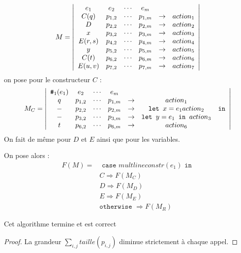 \documentclass{cours}
\begin{document}
\[
    M = \left|\begin{array}{cccccc}
        e_{1} & e_{2} & \cdots & e_{m} & &\\
        C(q) & p_{1, 2} & \cdots & p_{1, m} & \rightarrow & action_{1}\\
        D & p_{2, 2} & \cdots & p_{2, m} & \rightarrow & action_{2}\\
        x & p_{3, 2} & \cdots & p_{3, m} & \rightarrow & action_{3}\\
        E(r, s) & p_{4, 2} & \cdots & p_{4, m} & \rightarrow & action_{4}\\
        y & p_{5, 2} & \cdots & p_{5, m} & \rightarrow & action_{5}\\
        C(t)& p_{6, 2} & \cdots & p_{6, m} & \rightarrow & action_{6}\\
        E(u, v) & p_{7, 2} & \cdots & p_{7, m} & \rightarrow & action_{7}\\
    \end{array}\right|   
\]
on pose pour le constructeur $C$ : 
\[
    M_{C} = \left|\begin{array}{cccccc}
        \texttt{\#}_{1}(e_{1}) & e_{2} & \cdots & e_{m} & &\\
        q & p_{1, 2} & \cdots & p_{1, m} & \rightarrow & action_{1}\\
        - & p_{2, 2} & \cdots & p_{2, m} & \rightarrow & \texttt{let } x = e_{1}{action_{2}}\\
        - & p_{3, 2} & \cdots & p_{3, m} & \rightarrow & \texttt{let } y = e_{1} \texttt{ in }{action_{3}}\\
        t& p_{6, 2} & \cdots & p_{6, m} & \rightarrow & action_{6}\\
    \end{array} \texttt{ in }\right| 
\]
On fait de même pour $D$ et $E$ ainsi que pour les variables. 

On pose alors : 
\[
    \begin{split}
        F(M) = &\texttt{ case } multlineconstr(e_{1}) \texttt{ in }\\
        &C \Rightarrow F(M_{C})\\
        &D \Rightarrow F(M_{D})\\
        &E \Rightarrow F(M_{E})\\
        &\texttt{otherwise } \Rightarrow F(M_{R})
    \end{split}    
\]

\begin{proposition}
    Cet algorithme termine et est correct
\end{proposition}
\begin{proof}
    La grandeur $\sum_{i, j} taille(p_{i, j})$ diminue strictement à chaque appel.
\end{proof}
\end{document}
